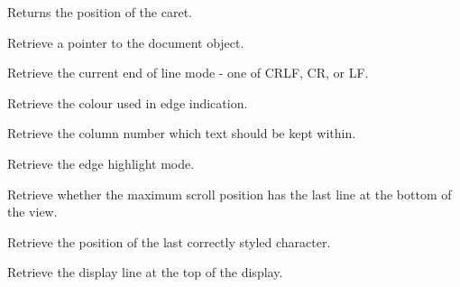 \label{wxstyledtextctrlgetcurrentpos}


Returns the position of the caret.


\label{wxstyledtextctrlgetdocpointer}


Retrieve a pointer to the document object.


\label{wxstyledtextctrlgeteolmode}


Retrieve the current end of line mode - one of CRLF, CR, or LF.


\label{wxstyledtextctrlgetedgecolour}


Retrieve the colour used in edge indication.


\label{wxstyledtextctrlgetedgecolumn}


Retrieve the column number which text should be kept within.


\label{wxstyledtextctrlgetedgemode}


Retrieve the edge highlight mode.


\label{wxstyledtextctrlgetendatlastline}


Retrieve whether the maximum scroll position has the last
line at the bottom of the view.


\label{wxstyledtextctrlgetendstyled}


Retrieve the position of the last correctly styled character.


\label{wxstyledtextctrlgetfirstvisibleline}


Retrieve the display line at the top of the display.



